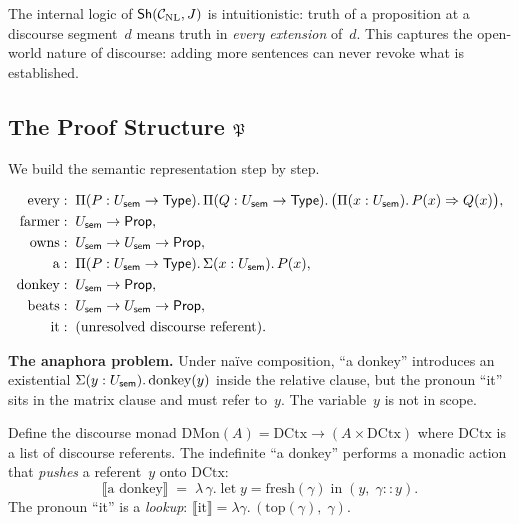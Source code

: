 The internal logic of $\mathsf{Sh}(\mathcal{C}_{\mathrm{NL}},J)$ is
intuitionistic: truth of a proposition at a discourse segment~$d$
means truth in \emph{every extension} of~$d$.  This captures the
open-world nature of discourse: adding more sentences can never
revoke what is established.

\subsection{The Proof Structure $\mathfrak{P}$}

We build the semantic representation step by step.

\begin{construction}
\label{con:lexicon}
\begin{align*}
  \text{every}   &:\; \Pi(P:U_{\mathsf{sem}}\to\mathsf{Type}).\,
                       \Pi(Q:U_{\mathsf{sem}}\to\mathsf{Type}).\,
                       \bigl(\Pi(x:U_{\mathsf{sem}}).\,P(x)\Rightarrow Q(x)\bigr), \\
  \text{farmer}  &:\; U_{\mathsf{sem}}\to\mathsf{Prop}, \\
  \text{owns}    &:\; U_{\mathsf{sem}}\to U_{\mathsf{sem}}\to\mathsf{Prop}, \\
  \text{a}       &:\; \Pi(P:U_{\mathsf{sem}}\to\mathsf{Type}).\,\Sigma(x:U_{\mathsf{sem}}).\,P(x), \\
  \text{donkey}  &:\; U_{\mathsf{sem}}\to\mathsf{Prop}, \\
  \text{beats}   &:\; U_{\mathsf{sem}}\to U_{\mathsf{sem}}\to\mathsf{Prop}, \\
  \text{it}      &:\; \text{(unresolved discourse referent)}.
\end{align*}
\end{construction}

\textbf{The anaphora problem.}\quad
Under na\"ive composition, ``a donkey'' introduces an existential
$\Sigma(y:U_{\mathsf{sem}}).\,\mathrm{donkey}(y)$ inside the relative clause,
but the pronoun ``it'' sits in the matrix clause and must refer
to~$y$.  The variable~$y$ is not in scope.

\begin{construction}
\label{con:dmon}
Define the discourse monad
$\mathrm{DMon}(A) = \mathrm{DCtx}\to(A\times\mathrm{DCtx})$
where $\mathrm{DCtx}$ is a list of discourse referents.
The indefinite ``a donkey'' performs a monadic action that
\emph{pushes} a referent~$y$ onto $\mathrm{DCtx}$:
\[
  \llbracket\text{a donkey}\rrbracket
  \;=\;
  \lambda\,\gamma.\;
  \mathrm{let}\;y=\mathrm{fresh}(\gamma)\;\mathrm{in}\;
  (y,\;\gamma\!::\!y).
\]
The pronoun ``it'' is a \emph{lookup}:
$\llbracket\text{it}\rrbracket = \lambda\gamma.\,
  (\mathrm{top}(\gamma),\;\gamma)$.
\end{construction}

